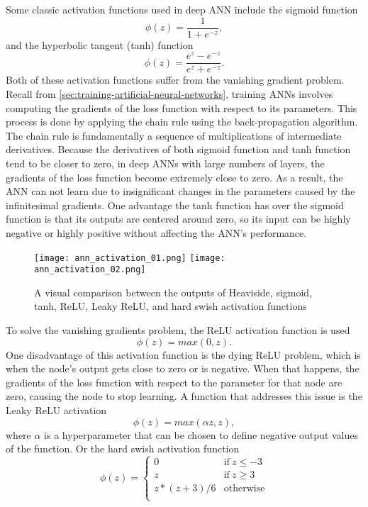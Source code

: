 Some classic activation functions used in deep \gls{ANN} include the sigmoid function
\begin{equation}
    \phi(z) = \frac{1}{1 + e^{-z}},
\end{equation}
and the hyperbolic tangent (tanh) function
\begin{equation}
    \phi(z) = \frac{e^z - e^{-z}}{e^z + e^{-z}}.
\end{equation}
Both of these activation functions suffer from the vanishing gradient problem.
Recall from \autoref{sec:training-artificial-neural-networks}, training \glspl{ANN} involves computing the gradients of the loss function with respect to its parameters.
This process is done by applying the chain rule using the back-propagation algorithm.
The chain rule is fundamentally a sequence of multiplications of intermediate derivatives.
Because the derivatives of both sigmoid function and tanh function tend to be closer to zero, in deep \glspl{ANN} with large numbers of layers, the gradients of the loss function become extremely close to zero.
As a result, the \gls{ANN} can not learn due to insignificant changes in the parameters caused by the infinitesimal gradients.
One advantage the tanh function has over the sigmoid function is that its outputs are centered around zero, so its input can be highly negative or highly positive without affecting the \gls{ANN}'s performance.

\begin{figure}[h]
    \centering
    \texttt{[image: ann\_activation\_01.png]}
    \texttt{[image: ann\_activation\_02.png]}
    \caption[Common activation functions]{A visual comparison between the outputs of Heaviside, sigmoid, tanh, ReLU, Leaky ReLU, and hard swish activation functions}
    \label{fig:heaviside-sigmoid-tanh}
\end{figure}

To solve the vanishing gradients problem, the \gls{ReLU} activation function is used
\begin{equation}
    \phi(z) = max(0, z).
\end{equation}
One disadvantage of this activation function is the dying \gls{ReLU} problem, which is when the node's output gets close to zero or is negative.
When that happens, the gradients of the loss function with respect to the parameter for that node are zero, causing the node to stop learning.
A function that addresses this issue is the Leaky \gls{ReLU} activation
\begin{equation}
    \phi(z) = max(\alpha z, z),
\end{equation}
where $\alpha$ is a hyperparameter that can be chosen to define negative output values of the function.
Or the hard swish activation function \cite{howardSearchingMobileNetV32019}
\begin{equation}
\phi(z)=\begin{cases}
    0 & \text{if}\ z \leq -3 \\
    z & \text{if}\ z \geq 3 \\
    z * (z + 3) / 6 & \text{otherwise}  \\
\end{cases}
\end{equation}